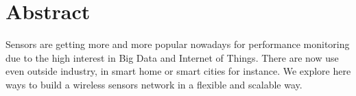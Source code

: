 \section*{Abstract}

Sensors are getting more and more popular nowadays for performance monitoring due to the high interest in Big Data and Internet of Things. There are now use even outside industry, in smart home or smart cities for instance. We explore here ways to build a wireless sensors network in a flexible and scalable way.